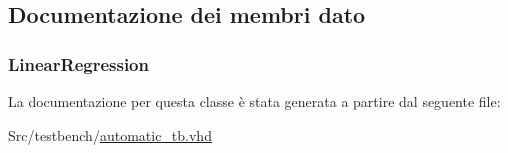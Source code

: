 \subsection{Documentazione dei membri dato}
\hypertarget{classautomatic__tb_1_1behavioral_a899499ba78b32b936cd0914831a72c95}{
\subsubsection[{Linear\+Regression}]{ {\bfseries \textcolor{vhdlchar}{ }} \hspace{0.3cm}{\ttfamily [Component]}}}\label{classautomatic__tb_1_1behavioral_a899499ba78b32b936cd0914831a72c95}
\hypertarget{classautomatic__tb_1_1behavioral_a1619316ad715601eb5d3559db829ac05}{
\subsubsection[{uut}]{ {\bfseries \textcolor{vhdlchar}{Linear\+Regression}\textcolor{vhdlchar}{ }} \hspace{0.3cm}{\ttfamily [Instantiation]}}}\label{classautomatic__tb_1_1behavioral_a1619316ad715601eb5d3559db829ac05}


La documentazione per questa classe è stata generata a partire dal seguente file\+:\begin{DoxyCompactItemize}
\item 
Src/testbench/\hyperlink{automatic__tb_8vhd}{automatic\+\_\+tb.\+vhd}\end{DoxyCompactItemize}
